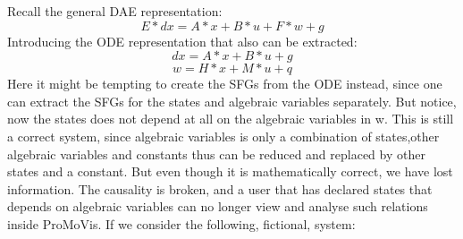 Recall the general DAE representation:
\begin{equation}
E*dx = A*x + B*u + F*w + g
\end{equation}Introducing the ODE representation that also can be extracted:
\begin{equation}
dx = A*x + B*u + g
\end{equation}
\begin{equation}
w  = H*x + M*u + q
\end{equation} Here it might be tempting to create the SFGs from the ODE instead, since one can extract the SFGs  for the states and algebraic variables separately. But notice, now the states does not depend at all on the algebraic variables in w. This is still a correct system, since algebraic variables is only a combination of states,other algebraic variables and constants thus can be reduced and replaced by other states and a constant. But even though it is mathematically correct, we have lost information. The causality is broken, and a user that has declared states that depends on algebraic variables can no longer view and analyse such relations inside ProMoVis. If we consider the following, fictional, system:

